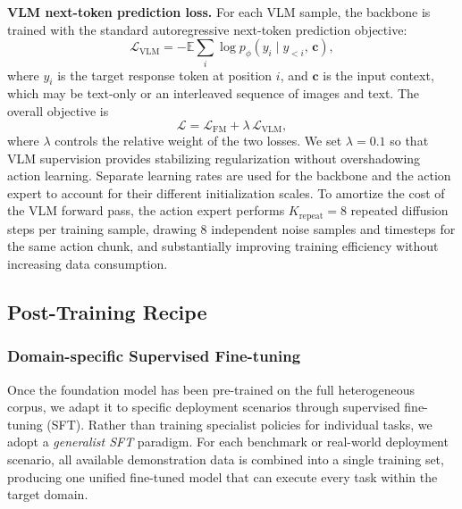 \textbf{VLM next-token prediction loss.}
For each VLM sample, the backbone is trained with the standard autoregressive next-token prediction objective:
\begin{equation}
    \mathcal{L}_{\mathrm{VLM}} = -\mathbb{E} \sum_{i} \log p_\phi\!\left(y_i \mid y_{<i},\, \mathbf{c}\right),
    \label{eq:vlm_loss}
\end{equation}
where $y_i$ is the target response token at position $i$, and $\mathbf{c}$ is the input context, which may be text-only or an interleaved sequence of images and text.
The overall objective is
\begin{equation}
    \mathcal{L} = \mathcal{L}_{\mathrm{FM}} + \lambda\,\mathcal{L}_{\mathrm{VLM}},
    \label{eq:total_loss}
\end{equation}
where $\lambda$ controls the relative weight of the two losses.
We set $\lambda = 0.1$ so that VLM supervision provides stabilizing regularization without overshadowing action learning. Separate learning rates are used for the backbone and the action expert to account for their different initialization scales.
To amortize the cost of the VLM forward pass, the action expert performs $K_{\mathrm{repeat}}{=}8$ repeated diffusion steps per training sample, drawing 8 independent noise samples and timesteps for the same action chunk, and substantially improving training efficiency without increasing data consumption.


\subsection{Post-Training Recipe}

\subsubsection{Domain-specific Supervised Fine-tuning}
\label{sec:domain_sft}
Once the foundation model has been pre-trained on the full heterogeneous corpus, we adapt it to specific deployment scenarios through supervised fine-tuning (SFT). 
Rather than training specialist policies for individual tasks, we adopt a \emph{generalist SFT} paradigm. 
For each benchmark or real-world deployment scenario, all available demonstration data is combined into a single training set, 
producing one unified fine-tuned model that can execute every task within the target domain. 

